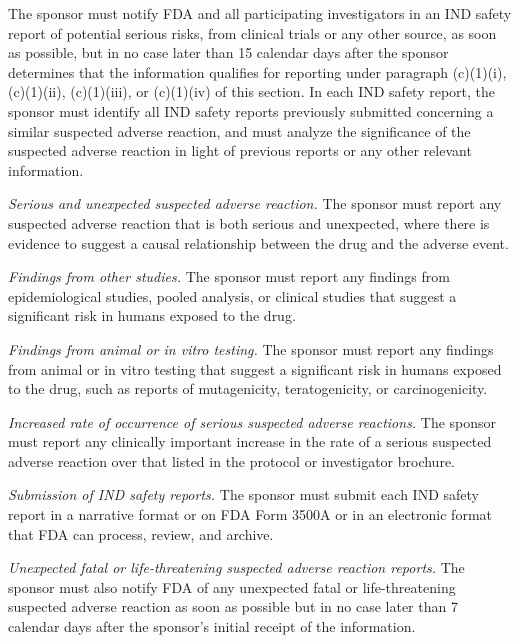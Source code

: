 \begin{description}[leftmargin=0.5cm,style=sameline]
\item[(1)] The sponsor must notify FDA and all participating investigators in an IND safety report of potential serious risks, from clinical trials or any other source, as soon as possible, but in no case later than 15 calendar days after the sponsor determines that the information qualifies for reporting under paragraph (c)(1)(i), (c)(1)(ii), (c)(1)(iii), or (c)(1)(iv) of this section. In each IND safety report, the sponsor must identify all IND safety reports previously submitted concerning a similar suspected adverse reaction, and must analyze the significance of the suspected adverse reaction in light of previous reports or any other relevant information.

\begin{description}[leftmargin=0.8cm,style=sameline]
\item[(i)] \textit{Serious and unexpected suspected adverse reaction.} The sponsor must report any suspected adverse reaction that is both serious and unexpected, where there is evidence to suggest a causal relationship between the drug and the adverse event.
\item[(ii)] \textit{Findings from other studies.} The sponsor must report any findings from epidemiological studies, pooled analysis, or clinical studies that suggest a significant risk in humans exposed to the drug.
\item[(iii)] \textit{Findings from animal or in vitro testing.} The sponsor must report any findings from animal or in vitro testing that suggest a significant risk in humans exposed to the drug, such as reports of mutagenicity, teratogenicity, or carcinogenicity.
\item[(iv)] \textit{Increased rate of occurrence of serious suspected adverse reactions.} The sponsor must report any clinically important increase in the rate of a serious suspected adverse reaction over that listed in the protocol or investigator brochure.
\item[(v)] \textit{Submission of IND safety reports.} The sponsor must submit each IND safety report in a narrative format or on FDA Form 3500A or in an electronic format that FDA can process, review, and archive.
\end{description}

\item[(2)] \textit{Unexpected fatal or life-threatening suspected adverse reaction reports.} The sponsor must also notify FDA of any unexpected fatal or life-threatening suspected adverse reaction as soon as possible but in no case later than 7 calendar days after the sponsor's initial receipt of the information.


\end{description}
